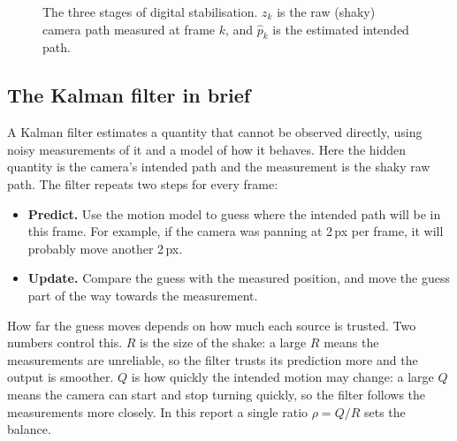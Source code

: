 \documentclass[11pt,a4paper]{article}
\begin{document}
\begin{figure}[htbp]
  \centering
  \caption{The three stages of digital stabilisation. $z_k$ is the raw (shaky) camera path
  measured at frame $k$, and $\hat p_k$ is the estimated intended path.}
  \label{fig:pipeline}
\end{figure}

\subsection{The Kalman filter in brief}
A Kalman filter estimates a quantity that cannot be observed directly, using noisy
measurements of it and a model of how it behaves. Here the hidden quantity is the camera's
intended path and the measurement is the shaky raw path. The filter repeats two steps for
every frame:
\begin{itemize}
  \item \textbf{Predict.} Use the motion model to guess where the intended path will be in
        this frame. For example, if the camera was panning at 2\,px per frame, it will
        probably move another 2\,px.
  \item \textbf{Update.} Compare the guess with the measured position, and move the guess
        part of the way towards the measurement.
\end{itemize}
How far the guess moves depends on how much each source is trusted. Two numbers control
this. $R$ is the size of the shake: a large $R$ means the measurements are unreliable, so the
filter trusts its prediction more and the output is smoother. $Q$ is how quickly the intended
motion may change: a large $Q$ means the camera can start and stop turning quickly, so the
filter follows the measurements more closely. In this report a single ratio $\rho = Q/R$ sets
the balance.
\end{document}
